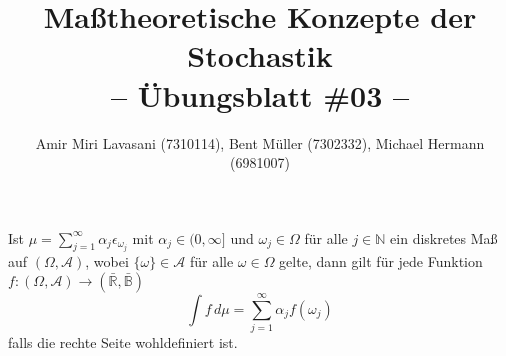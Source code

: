 \documentclass[10pt]{article}
\newenvironment{Aufgabe}[2][Aufgabe]{\begin{trivlist}
\item[\hskip \labelsep {\bfseries #1}\hskip \labelsep {\bfseries #2.}]}{\end{trivlist}}
\begin{document}
 
\title{ \textbf{Maßtheoretische Konzepte der Stochastik \\ -- Übungsblatt \#03 --} }

\author{Amir Miri Lavasani (7310114), Bent Müller (7302332),
        Michael Hermann (6981007)}
\maketitle

\begin{Aufgabe}{1} %
Ist $\mu = \sum_{j=1}^\infty \alpha_j \epsilon_{\omega_j}$ mit $\alpha_j \in (0, \infty]$ und $\omega_j \in \Omega$ für alle $j \in \mathbb{N}$ ein diskretes Maß auf $(\Omega, \mathcal{A})$, wobei $\{\omega \} \in \mathcal{A}$ für alle $\omega \in \Omega$ gelte, 
dann gilt für jede Funktion $f:(\Omega, \mathcal{A}) \rightarrow (\bar{\mathbb{R}}, \bar{\mathbb{B}})$
\begin{equation}
\label{eq: int}
\int f \, d\mu = \sum_{j=1}^\infty \alpha_j f(\omega_j)
\end{equation}
falls die rechte Seite wohldefiniert ist. 
\end{Aufgabe}
\end{document}
